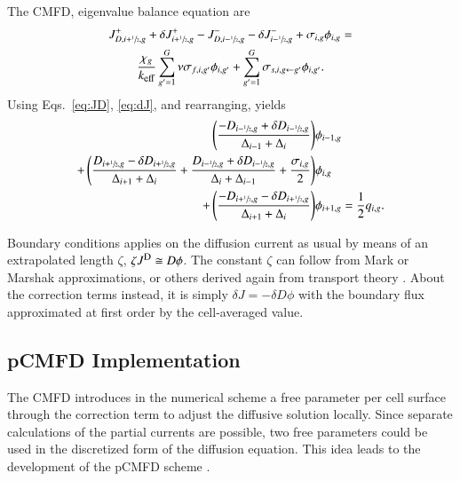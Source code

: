 The CMFD, eigenvalue balance equation are 
\begin{equation}
  \label{eq:CMFD-diff}
  \begin{gathered}
  J^+_{D,i+\hzi,g} + \delj^+_{i+\hzi,g} - J^-_{D,i-\hzi,g} - \delj^-_{i-\hzi,g} + \sigma_{i,g}\phi_{i,g}=\\
  \frac{\chi_g}{\keff}\sum\limits_{g'=1}^G\nu\sigma_{f,i,g'}\phi_{i,g'} + \sum\limits_{g'=1}^G\sigma_{s,i,g\leftarrow g'}\phi_{i,g'}.
  \end{gathered}
\end{equation}
Using Eqs.~\eqref{eq:JD}, \eqref{eq:dJ}, and rearranging, yields
\begin{equation}
  \label{eq:CMFD-diff-rearranged}
  \begin{split}
  \left( \frac{-D_{i-\sfrac{1}{2},g} + \delta D_{i-\sfrac{1}{2},g}}{\Delta_{i-1} + \Delta_i}\right) &\phi_{i-1,g} \\
  + \left(\frac{D_{i+\sfrac{1}{2},g} - \delta D_{i+\sfrac{1}{2},g}}{\Delta_{i+1} + \Delta_i} + \frac{D_{i-\sfrac{1}{2},g} + \delta D_{i-\sfrac{1}{2},g}}{\Delta_i + \Delta_{i-1}} + \frac{\sigma_{i,g}}{2}\right) &\phi_{i,g} \\
  + \left( \frac{-D_{i+\sfrac{1}{2},g} - \delta D_{i+\sfrac{1}{2},g}}{\Delta_{i+1} + \Delta_i} \right) &\phi_{i+1,g} = \frac{1}{2}q_{i,g}.
  \end{split}
\end{equation}

Boundary conditions applies on the diffusion current as usual by means of an extrapolated length $\zeta$, \ie{} $\zeta \jD \cong D \phi$. The constant $\zeta$ can follow from Mark or Marshak approximations, or others derived again from transport theory \cite{meghreblian1960reactor}. About the correction terms instead, it is simply $\delta J = -\delta D \phi$ with the boundary flux approximated at first order by the cell-averaged value.

\subsection{pCMFD Implementation}
\label{sec:RM-pCMFD}

The CMFD introduces in the numerical scheme a free parameter per cell surface through the correction term to adjust the diffusive solution locally. Since separate calculations of the partial currents are possible, two free parameters could be used in the discretized form of the diffusion equation. This idea leads to the development of the pCMFD scheme \cite{cho2003comparison}.

